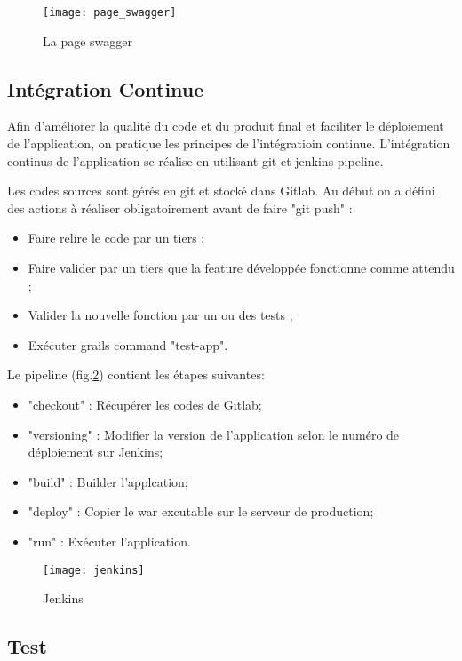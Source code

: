 \begin{figure}[ht]
 \centering
 \texttt{[image: page\_swagger]}
 \caption{La page swagger}
 \label{fig:page_swagger}
\end{figure}

\subsection{Intégration Continue}
Afin d'améliorer la qualité du code et du produit final et faciliter le déploiement de l'application, on pratique les principes de l'intégratioin continue.
L'intégration continus de l'application se réalise en utilisant git et jenkins pipeline.

Les codes sources sont gérés en git et stocké dans Gitlab.
Au début on a défini des actions à réaliser obligatoirement avant de faire "git push" :
\begin{itemize}
 \item Faire relire le code par un tiers ;
 \item Faire valider par un tiers que la feature développée fonctionne comme attendu ;
 \item Valider la nouvelle fonction par un ou des tests ;
 \item Exécuter grails command "test-app".
\end{itemize}

Le pipeline (fig.\ref{fig:jenkins}) contient les étapes suivantes:
\begin{itemize}
 \item "checkout" : Récupérer les codes de Gitlab;
 \item "versioning" : Modifier la version de l'application selon le numéro de déploiement sur Jenkins;
 \item "build" : Builder l'applcation;
 \item "deploy" : Copier le war excutable sur le serveur de production;
 \item "run" : Exécuter l'application.
\end{itemize}

\begin{figure}[ht]
 \centering
 \texttt{[image: jenkins]}
 \caption{Jenkins}
 \label{fig:jenkins}
\end{figure}

\subsection{Test}

